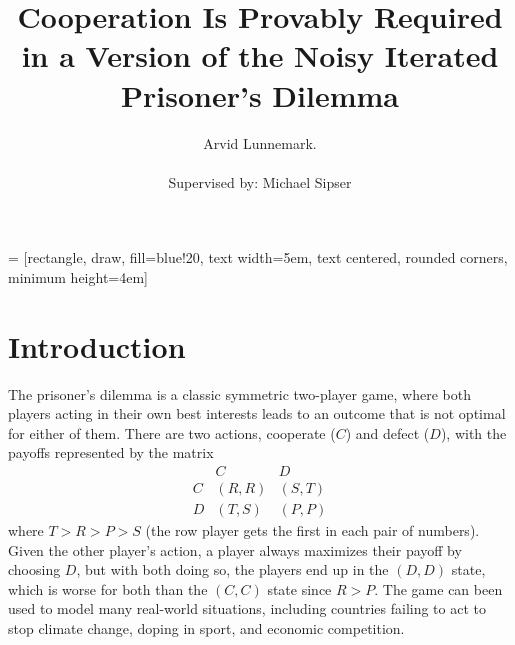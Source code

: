 \documentclass[11pt]{amsart}
\title{Cooperation Is Provably Required in a Version of the Noisy Iterated Prisoner's Dilemma}
\author{Arvid Lunnemark. \\ \\
Supervised by: Michael Sipser}
\theoremstyle{definition}
\theoremstyle{remark}
\begin{document}
 = [rectangle, draw, fill=blue!20, 
    text width=5em, text centered, rounded corners, minimum height=4em]

\maketitle

\section{Introduction}

The prisoner's dilemma is a classic symmetric two-player game, where both players acting in their own best interests leads to an outcome that is not optimal for either of them. There are two actions, cooperate ($C$) and defect ($D$), with the payoffs represented by the matrix
\begin{equation*}
  \begin{matrix}
      &  C & D \\ 
    C &  (R, R) & (S, T) \\
    D & (T, S) & (P, P)
  \end{matrix}
\end{equation*} 
where $T > R > P > S$ (the row player gets the first in each pair of numbers). Given the other player's action, a player always maximizes their payoff by choosing $D$, but with both doing so, the players end up in the $(D, D)$ state, which is worse for both than the $(C, C)$ state since $R > P$. The game can been used to model many real-world situations, including countries failing to act to stop climate change, doping in sport, and economic competition.
\end{document}
